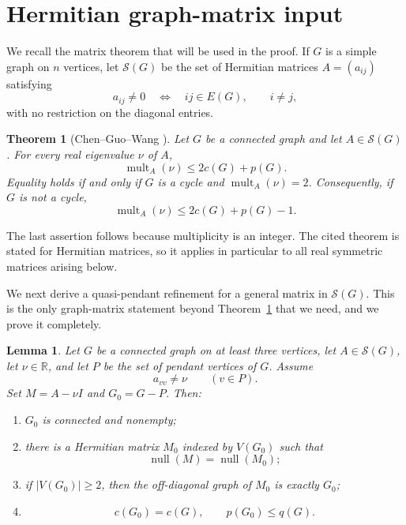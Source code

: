 \documentclass[12pt]{article}
\newtheorem{theorem}{Theorem}
\newtheorem{lemma}{Lemma}
\theoremstyle{remark}
\newcommand{\R}{\mathbb{R}}
\newcommand{\nullity}{\operatorname{null}}
\newcommand{\mult}{\operatorname{mult}}
\begin{document}
\section{Hermitian graph-matrix input}

We recall the matrix theorem that will be used in the proof.  If $G$ is a simple graph on $n$ vertices, let $\mathcal S(G)$ be the set of Hermitian matrices $A=(a_{ij})$ satisfying
\[
a_{ij}\ne0\quad\Longleftrightarrow\quad ij\in E(G),\qquad i\ne j,
\]
with no restriction on the diagonal entries.

\begin{theorem}[Chen--Guo--Wang \cite{ChenGuoWang}]\label{thm:CGW}
Let $G$ be a connected graph and let $A\in\mathcal S(G)$.  For every real eigenvalue $\nu$ of $A$,
\[
\mult_A(\nu)\le 2c(G)+p(G).
\]
Equality holds if and only if $G$ is a cycle and $\mult_A(\nu)=2$.  Consequently, if $G$ is not a cycle,
\[
\mult_A(\nu)\le 2c(G)+p(G)-1.
\]
\end{theorem}

The last assertion follows because multiplicity is an integer.  The cited theorem is stated for Hermitian matrices, so it applies in particular to all real symmetric matrices arising below.

We next derive a quasi-pendant refinement for a general matrix in $\mathcal S(G)$.  This is the only graph-matrix statement beyond Theorem~\ref{thm:CGW} that we need, and we prove it completely.

\begin{lemma}\label{lem:pendant-elim}
Let $G$ be a connected graph on at least three vertices, let $A\in\mathcal S(G)$, let $\nu\in\R$, and let $P$ be the set of pendant vertices of $G$.  Assume
\[
a_{vv}\ne\nu\qquad(v\in P).
\]
Set $M=A-\nu I$ and $G_0=G-P$.  Then:
\begin{enumerate}
\item[(i)] $G_0$ is connected and nonempty;
\item[(ii)] there is a Hermitian matrix $M_0$ indexed by $V(G_0)$ such that
\[
\nullity(M)=\nullity(M_0);
\]
\item[(iii)] if $|V(G_0)|\ge2$, then the off-diagonal graph of $M_0$ is exactly $G_0$;
\item[(iv)]
\[
c(G_0)=c(G),\qquad p(G_0)\le q(G).
\]
\end{enumerate}
\end{lemma}
\end{document}
